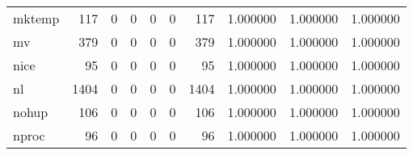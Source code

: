 \begin{tabular}{lrrrrrrrrr}
mktemp    &                                                117 &                                                  0 &                                                  0 &                                                  0 &                                                  0 &                                                117 &                                           1.000000 &                               1.000000 &                             1.000000 \\
mv        &                                                379 &                                                  0 &                                                  0 &                                                  0 &                                                  0 &                                                379 &                                           1.000000 &                               1.000000 &                             1.000000 \\
nice      &                                                 95 &                                                  0 &                                                  0 &                                                  0 &                                                  0 &                                                 95 &                                           1.000000 &                               1.000000 &                             1.000000 \\
nl        &                                               1404 &                                                  0 &                                                  0 &                                                  0 &                                                  0 &                                               1404 &                                           1.000000 &                               1.000000 &                             1.000000 \\
nohup     &                                                106 &                                                  0 &                                                  0 &                                                  0 &                                                  0 &                                                106 &                                           1.000000 &                               1.000000 &                             1.000000 \\
nproc     &                                                 96 &                                                  0 &                                                  0 &                                                  0 &                                                  0 &                                                 96 &                                           1.000000 &                               1.000000 &                             1.000000 \\

\end{tabular}
